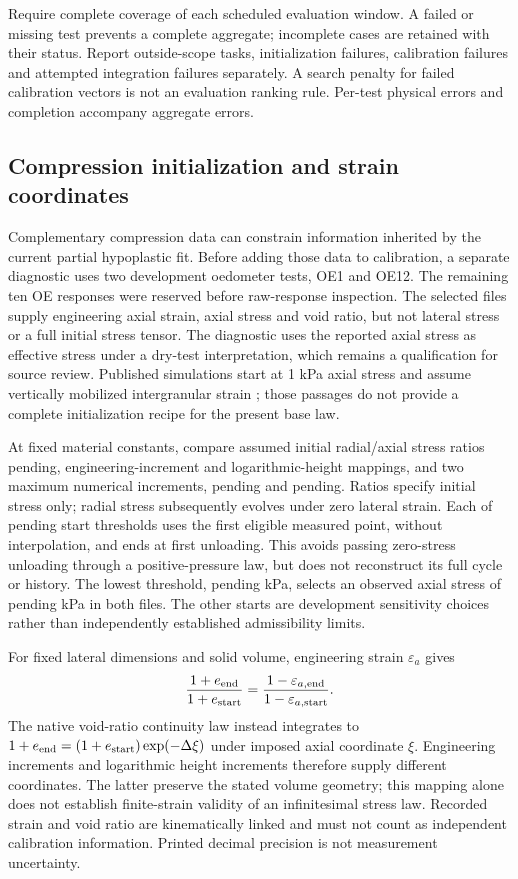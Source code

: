 \documentclass[11pt,a4paper]{article}
\newcommand{\CompressionStartThresholdCount}{pending}
\newcommand{\CompressionStartThresholdKPa}{pending}
\newcommand{\CompressionObservedStartKPa}{pending}
\newcommand{\CompressionCoarseIncrement}{pending}
\newcommand{\CompressionFineIncrement}{pending}
\newcommand{\CompressionStressRatios}{pending}}
\begin{document}
Require complete coverage of each scheduled evaluation window. A failed or missing test prevents a complete aggregate; incomplete cases are retained with their status. Report outside-scope tasks, initialization failures, calibration failures and attempted integration failures separately. A search penalty for failed calibration vectors is not an evaluation ranking rule. Per-test physical errors and completion accompany aggregate errors.

\subsection{Compression initialization and strain coordinates}
Complementary compression data can constrain information inherited by the current partial hypoplastic fit. Before adding those data to calibration, a separate diagnostic uses two development oedometer tests, OE1 and OE12. The remaining ten OE responses were reserved before raw-response inspection. The selected files supply engineering axial strain, axial stress and void ratio, but not lateral stress or a full initial stress tensor. The diagnostic uses the reported axial stress as effective stress under a dry-test interpretation, which remains a qualification for source review. Published simulations start at 1 kPa axial stress and assume vertically mobilized intergranular strain \cite{wt1,wichtmann2019}; those passages do not provide a complete initialization recipe for the present base law.

At fixed material constants, compare assumed initial radial/axial stress ratios \CompressionStressRatios{}, engineering-increment and logarithmic-height mappings, and two maximum numerical increments, \CompressionCoarseIncrement{} and \CompressionFineIncrement{}. Ratios specify initial stress only; radial stress subsequently evolves under zero lateral strain. Each of \CompressionStartThresholdCount{} start thresholds uses the first eligible measured point, without interpolation, and ends at first unloading. This avoids passing zero-stress unloading through a positive-pressure law, but does not reconstruct its full cycle or history. The lowest threshold, \CompressionStartThresholdKPa{} kPa, selects an observed axial stress of \CompressionObservedStartKPa{} kPa in both files. The other starts are development sensitivity choices rather than independently established admissibility limits.

For fixed lateral dimensions and solid volume, engineering strain \(\varepsilon_a\) gives
\[
\frac{1+e_{\rm end}}{1+e_{\rm start}}=
\frac{1-\varepsilon_{a,\rm end}}{1-\varepsilon_{a,\rm start}}.
\]
The native void-ratio continuity law instead integrates to \(1+e_{\rm end}=(1+e_{\rm start})\exp(-\Delta\xi)\) under imposed axial coordinate \(\xi\). Engineering increments and logarithmic height increments therefore supply different coordinates. The latter preserve the stated volume geometry; this mapping alone does not establish finite-strain validity of an infinitesimal stress law. Recorded strain and void ratio are kinematically linked and must not count as independent calibration information. Printed decimal precision is not measurement uncertainty.
\end{document}
